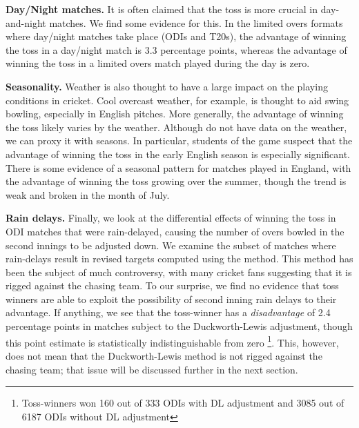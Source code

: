 \documentclass[11pt,  letterpaper]{article}
\begin{document}
\textbf{Day/Night matches.} It is often claimed that the toss is more crucial in day-and-night matches. We find some evidence for this. In the limited overs formats where day/night matches take place (ODIs and T20s), the advantage of winning the toss in a day/night match is 3.3 percentage points, whereas the
advantage of winning the toss in a limited overs match played during the day is zero. 

\textbf{Seasonality.} Weather is also thought to have a large impact on the playing conditions in cricket. Cool
overcast weather, for example, is thought to aid swing bowling, especially in English pitches. More generally,
the advantage of winning the toss likely varies by the weather. Although do not have data on
the weather, we can proxy it with seasons. In particular, students of the game suspect that
the advantage of winning the toss in the early English season is especially significant.
There is some evidence of a seasonal pattern for matches played in England, with the advantage of winning the toss
growing over the summer, though the trend is weak and broken in the month of July.

\textbf{Rain delays.} Finally, we look at the differential effects of winning the toss in ODI matches that were rain-delayed, causing the number of overs bowled in the second innings to be adjusted down. We examine the subset of matches where rain-delays result in revised targets computed using the \citet{duckworth1998} method. This method has been the subject of much controversy, with many cricket fans suggesting that it is rigged against the chasing team. To our surprise, we find no evidence that toss winners are able to exploit the possibility of second inning rain delays to their advantage. If anything, we see that the toss-winner has a \emph{disadvantage} of 2.4 percentage points in matches subject to the Duckworth-Lewis adjustment, though this point estimate is statistically indistinguishable from zero \footnote{Toss-winners won 160 out of 333 ODIs with DL adjustment and 3085 out of 6187 ODIs without DL adjustment}. This, however, does not mean that the Duckworth-Lewis method is not rigged against the chasing team; that issue will be discussed further in the next section.



% 
\end{document}
